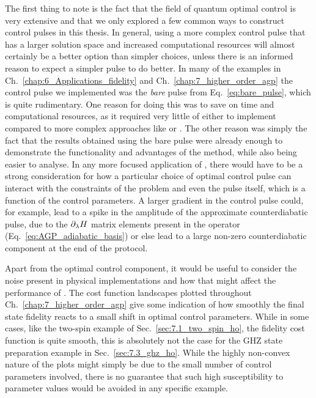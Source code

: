 The first thing to note is the fact that the field of quantum optimal control is very extensive and that we only explored a few common ways to construct control pulses in this thesis. In general, using a more complex control pulse that has a larger solution space and increased computational resources will almost certainly be a better option than simpler choices, unless there is an informed reason to expect a simpler pulse to do better. In many of the examples in Ch.~\ref{chap:6_Applications_fidelity} and Ch.~\ref{chap:7_higher_order_agp} the control pulse we implemented was the \emph{bare} pulse from Eq.~\eqref{eq:bare_pulse}, which is quite rudimentary. One reason for doing this was to save on time and computational resources, as it required very little of either to implement compared to more complex approaches like  or . The other reason was simply the fact that the results obtained using the bare pulse were already enough to demonstrate the functionality and advantages of the method, while also being easier to analyse. In any more focused application of , there would have to be a strong consideration for how a particular choice of optimal control pulse can interact with the constraints of the problem and even the  pulse itself, which is a function of the control parameters. A larger gradient in the control pulse could, for example, lead to a spike in the amplitude of the approximate counterdiabatic pulse, due to the $\partial_{\lambda} H$ matrix elements present in the  operator (Eq.~\eqref{eq:AGP_adiabatic_basis}) or else lead to a large non-zero counterdiabatic component at the end of the protocol. 

Apart from the optimal control component, it would be useful to consider the noise present in physical implementations and how that might affect the performance of . The cost function landscapes plotted throughout Ch.~\ref{chap:7_higher_order_agp} give some indication of how smoothly the final state fidelity reacts to a small shift in optimal control parameters. While in some cases, like the two-spin example of Sec.~\ref{sec:7.1_two_spin_ho}, the fidelity cost function is quite smooth, this is absolutely not the case for the GHZ state preparation example in Sec.~\ref{sec:7.3_ghz_ho}. While the highly non-convex nature of the plots might simply be due to the small number of control parameters involved, there is no guarantee that such high susceptibility to parameter values would be avoided in any specific example.


